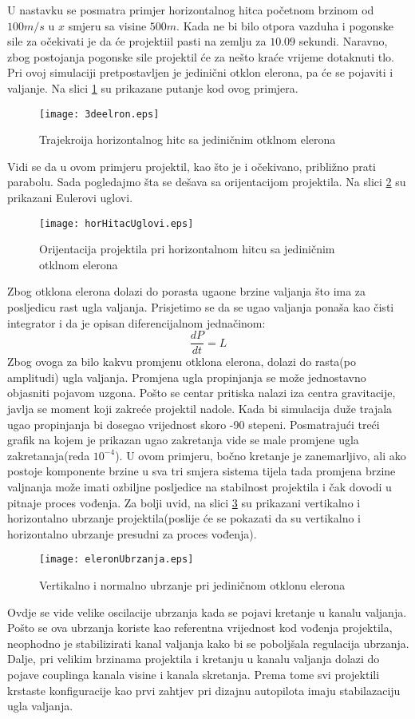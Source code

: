 U nastavku se posmatra primjer horizontalnog hitca početnom brzinom od $100m/s$ u $x$ smjeru
sa visine $500m$. Kada ne bi bilo otpora vazduha i pogonske sile za očekivati je da će projektiil pasti na zemlju 
za $10.09$ sekundi. Naravno, zbog postojanja pogonske sile projektil će za nešto kraće vrijeme 
dotaknuti tlo. Pri ovoj simulaciji pretpostavljen je jedinični otklon elerona, pa će se pojaviti i valjanje. 
Na slici \ref{fig:eleronPutanja} su prikazane putanje kod ovog primjera. 
\begin{figure}[!ht]
    \centering
    \texttt{[image: 3deelron.eps]}
    \caption{Trajekroija horizontalnog hitc sa jediničnim otklnom elerona}
    \label{fig:eleronPutanja}
\end{figure}
Vidi se da u ovom primjeru projektil, kao što je i očekivano, približno prati parabolu. 
Sada pogledajmo šta se dešava sa orijentacijom projektila. Na slici \ref{fig:orijentacijaEleron}
su prikazani Eulerovi uglovi. 
\begin{figure}[!ht]
    \centering
    \texttt{[image: horHitacUglovi.eps]}
    \caption{Orijentacija projektila pri horizontalnom hitcu sa jediničnim otklnom elerona}
    \label{fig:orijentacijaEleron}
\end{figure}
Zbog otklona elerona dolazi do porasta ugaone brzine valjanja što ima za posljedicu 
rast ugla valjanja. Prisjetimo se da se ugao valjanja ponaša kao čisti integrator i da je 
opisan diferencijalnom jednačinom:
\begin{equation*}
    \frac{dP}{dt} = L
\end{equation*}
Zbog ovoga za bilo kakvu promjenu otklona elerona, dolazi do rasta(po amplitudi) ugla valjanja. 
Promjena ugla propinjanja se može jednostavno objasniti pojavom uzgona. Pošto se centar pritiska nalazi 
iza centra gravitacije, javlja se moment koji zakreće projektil nadole. Kada bi simulacija duže trajala 
ugao propinjanja bi dosegao vrijednost skoro -90 stepeni. Posmatrajući treći grafik na kojem 
je prikazan ugao zakretanja vide se male promjene ugla zakretanaja(reda $10^{-4}$). U ovom primjeru,
bočno kretanje je zanemarljivo, ali ako postoje komponente brzine u sva tri smjera sistema tijela tada 
promjena brzine valjnanja može imati ozbiljne posljedice na stabilnost projektila i čak dovodi u pitnaje proces vođenja.
Za bolji uvid, na slici \ref{fig:eleronUbrzanja} su prikazani vertikalno i horizontalno ubrzanje projektila(poslije će se pokazati 
da su vertikalno i horizontalno ubrzanje presudni za proces vođenja).  
\begin{figure}[!ht]
    \centering
    \texttt{[image: eleronUbrzanja.eps]}
    \caption{Vertikalno i normalno ubrzanje pri jediničnom otklonu elerona}
    \label{fig:eleronUbrzanja}
\end{figure}
Ovdje se vide velike oscilacije ubrzanja kada se pojavi kretanje u kanalu valjanja. Pošto se 
ova ubrzanja koriste kao referentna vrijednost kod vođenja projektila, neophodno je stabilizirati 
kanal valjanja kako bi se poboljšala regulacija ubrzanja. 
Dalje, pri velikim brzinama projektila i kretanju u kanalu valjanja dolazi do pojave couplinga 
kanala visine i kanala skretanja. Prema tome svi projektili krstaste konfiguracije 
kao prvi zahtjev pri dizajnu autopilota imaju stabilazaciju ugla valjanja. 
